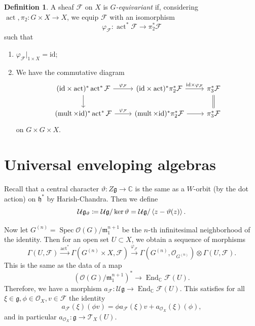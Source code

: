 \documentclass[leqno, openany]{memoir}
\theoremstyle{definition}
\newtheorem{defn}[thm]{Definition}
\theoremstyle{remark}
\theoremstyle{plain}
\theoremstyle{definition}
\theoremstyle{remark}
\newcommand{\C}{\mathbb{C}}
\newcommand{\g}{\mathfrak{g}}
\newcommand{\mc}[1]{\mathcal{#1}}
\newcommand{\mf}[1]{\mathfrak{#1}}
\newcommand{\mr}[1]{\mathrm{#1}}
\newcommand{\on}[1]{\operatorname{#1}}
\DeclareMathOperator{\End}{End}
\DeclareMathOperator{\Spec}{Spec}
\begin{document}
\begin{defn}
    A sheaf $\mc{F}$ on $X$ is \textit{$G$-equivariant} if, considering $\on{act}, \pi_2 \colon G \times X \to X$, we equip $\mc{F}$ with an isomorphism 
    \[ \varphi_{\mc{F}} \colon \on{act}^* \mc{F} \to \pi_2^* \mc{F} \]
    such that
    \begin{enumerate}
        \item $\varphi_{\mc{F}}|_{1 \times X} = \mr{id}$;
        \item We have the commutative diagram
            \begin{equation*}
            \begin{tikzcd}
                (\mr{id} \times \on{act})^* \on{act}^* \mc{F} \ar{d} \ar{r}{\varphi_{\mc{F}}} & (\mr{id} \times \on{act})^* \pi_2^* \mc{F} \ar{r}{\mr{id} \times \varphi_{\mc{F}}} & \pi_3^* \mc{F} \ar[equals]{d} \\
                (\on{mult} \times \mr{id})^* \on{act}^* \mc{F} \ar{r}{\varphi_{\mc{F}}} & (\on{mult} \times \mr{id})^* \pi_2^* \mc{F} \ar{r} & \pi_3^* \mc{F}
            \end{tikzcd}
            \end{equation*}
            on $G \times G \times X$.
    \end{enumerate}
\end{defn}

\section{Universal enveloping algebras}

Recall that a central character $\vartheta \colon Z \mf{g} \to \C$ is the same as a $W$-orbit (by the dot action) on $\mf{h}^*$ by Harish-Chandra. Then we define
\[ \mc{U} \g_{\vartheta} \coloneqq \mc{U} \g / \ker \vartheta = \mc{U} \g / \ev{z - \vartheta(z)}. \]

Now let $G^{ (n) } = \Spec \mc{O}(G) / \mf{m}_{1}^{n+1}$ be the $n$-th infinitesimal neighborhood of the identity. Then for an open set $U \subset X$, we obtain a sequence of morphisms
\[ \Gamma(U, \mc{F}) \xrightarrow{\on{act}^*} \Gamma(G^{(n)} \times X, \mc{F}) \xrightarrow{\varphi_{\mc{F}}} \Gamma(G^{(n)}, \mc{O}_{G^{(n)}}) \otimes \Gamma(U, \mc{F}). \]
This is the same as the data of a map
\[ (\mc{O}(G) / \mf{m}_1^{n+1})^* \to \End_{\C} \mc{F}(U). \]
Therefore, we have a morphism $a_{\mc{F}} \colon \mc{U} \g \to \End_{\C} \mc{F}(U)$. This satisfies for all $\xi \in \g, \phi \in \mc{O}_X, v \in \mc{F}$ the identity
\[ a_{\mc{F}}(\xi) (\phi v) = \phi a_{\mc{F}}(\xi)v + a_{\mc{O}_X}(\xi)(\phi), \]
and in particular $a_{\mc{O}_X} \colon \g \to \mc{T}_X(U)$.
\end{document}
